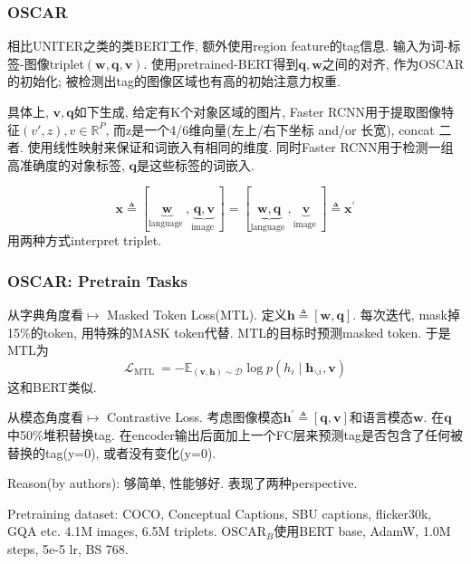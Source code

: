 \documentclass{beamer}
\newcommand{\R}{\mathbb{R}}
\newcommand{\bs}[1]{\boldsymbol{#1}}
\begin{document}
\begin{frame}
    \frametitle{OSCAR}

    相比UNITER之类的类BERT工作, 额外使用region feature的tag信息. 输入为词-标签-图像triplet$(\boldsymbol{w}, \boldsymbol{q}, \boldsymbol{v})$. 使用pretrained-BERT得到$\bs q, \bs w$之间的对齐, 作为OSCAR的初始化; 被检测出tag的图像区域也有高的初始注意力权重.

    具体上, $\bs v, \bs q$如下生成, 给定有K个对象区域的图片, 
    Faster RCNN用于提取图像特征$(v',z), v\in \R^P$,
    而z是一个4/6维向量(左上/右下坐标 and/or 长宽), concat 二者. 使用线性映射来保证和词嵌入有相同的维度. 同时Faster RCNN用于检测一组高准确度的对象标签, $\bs q$是这些标签的词嵌入.

    \begin{equation}
        \boldsymbol{x} \triangleq[\underbrace{\boldsymbol{w}}_{\text {language }}, \underbrace{\boldsymbol{q}, \boldsymbol{v}}_{\text {image }}]=[\underbrace{\boldsymbol{w}, \boldsymbol{q}}_{\text {language }}, \underbrace{\boldsymbol{v}}_{\text {image }}] \triangleq \boldsymbol{x}^{\prime}
    \end{equation}
    用两种方式interpret triplet.

\end{frame}

\begin{frame}
    \frametitle{OSCAR: Pretrain Tasks}

    从字典角度看$\mapsto$ Masked Token Loss(MTL). 定义$\boldsymbol{h} \triangleq[\boldsymbol{w}, \boldsymbol{q}]$. 每次迭代, mask掉15\%的token, 用特殊的MASK token代替. MTL的目标时预测masked token. 于是MTL为
    \begin{equation}
        \mathcal{L}_{\text {MTL }}=-\mathbb{E}_{(\boldsymbol{v}, \boldsymbol{h}) \sim \mathcal{D}} \log p\left(h_{i} \mid \boldsymbol{h}_{\backslash i}, \boldsymbol{v}\right)
    \end{equation}
    这和BERT类似.

    从模态角度看$\mapsto$ Contrastive Loss. 考虑图像模态$\boldsymbol{h}^{\prime} \triangleq[\boldsymbol{q}, \boldsymbol{v}]$和语言模态$\bs w$. 在$\bs q$中50\%堆积替换tag. 在encoder输出后面加上一个FC层来预测tag是否包含了任何被替换的tag(y=0), 或者没有变化(y=0).

    Reason(by authors): 够简单, 性能够好. 表现了两种perspective.

    Pretraining dataset: COCO, Conceptual Captions, SBU captions, flicker30k, GQA etc. 4.1M images, 6.5M triplets. $\text{OSCAR}_B$使用BERT base, AdamW, 1.0M steps, 5e-5 lr, BS 768.

\end{frame}
\end{document}
